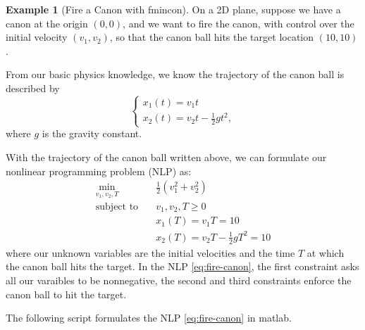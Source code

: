 \documentclass[
]{book}
\theoremstyle{definition}
\theoremstyle{definition}
\newtheorem{example}{Example}[chapter]
\theoremstyle{definition}
\theoremstyle{definition}
\theoremstyle{remark}
\begin{document}
\begin{example}[Fire a Canon with fmincon]
\protect\hypertarget{exm:fmincon-example}{}\label{exm:fmincon-example}On a 2D plane, suppose we have a canon at the origin \((0,0)\), and we want to fire the canon, with control over the initial velocity \((v_1, v_2)\), so that the canon ball hits the target location \((10,10)\).

From our basic physics knowledge, we know the trajectory of the canon ball is described by
\[
\begin{cases}
x_1(t) = v_1 t \\
x_2(t) = v_2 t - \frac{1}{2}g t^2,
\end{cases}
\]
where \(g\) is the gravity constant.

With the trajectory of the canon ball written above, we can formulate our nonlinear programming problem (NLP) as:
\begin{equation}
\begin{split}
\min_{v_1, v_2, T} & \quad \frac{1}{2} (v_1^2 + v_2^2) \\
\text{subject to} & \quad v_1, v_2, T \geq 0 \\
& \quad x_1(T) = v_1 T = 10 \\
& \quad x_2(T) = v_2 T - \frac{1}{2}g T^2 = 10 
\end{split}
\label{eq:fire-canon}
\end{equation}
where our unknown variables are the initial velocities and the time \(T\) at which the canon ball hits the target. In the NLP \eqref{eq:fire-canon}, the first constraint asks all our varaibles to be nonnegative, the second and third constraints enforce the canon ball to hit the target.

The following script formulates the NLP \eqref{eq:fire-canon} in matlab.


\end{example}
\end{document}
